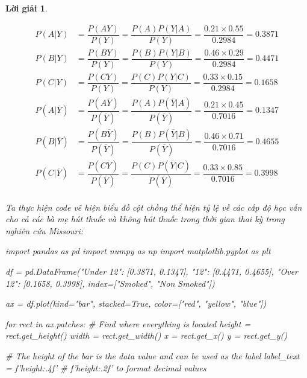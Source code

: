 \documentclass[14pt, a4paper]{article}
\theoremstyle{sltheorem}
\theoremstyle{soltheorem}
\newtheorem*{loigiai}{Lời giải}
\begin{document}
\begin{loigiai}
\begin{enumerate}[wide, labelwidth=!, labelindent=0pt,label=\textbf{\arabic*}.]
        \begin{equation*}
            \begin{aligned}
                P(A \vert Y) &= \dfrac{P(AY)}{P(Y)}=\dfrac{P(A)P(Y\vert A)}{P(Y)}=\dfrac{0.21\times 0.55}{0.2984}=0.3871 \\
                P(B \vert Y) &= \dfrac{P(BY)}{P(Y)}=\dfrac{P(B)P(Y\vert B)}{P(Y)}=\dfrac{0.46\times 0.29}{0.2984}=0.4471 \\
                P(C \vert Y) &= \dfrac{P(CY)}{P(Y)}=\dfrac{P(C)P(Y\vert C)}{P(Y)}=\dfrac{0.33\times 0.15}{0.2984}=0.1658 \\
                P(A \vert \overline{Y}) &= \dfrac{P(A\overline{Y})}{P(\overline{Y})}=\dfrac{P(A)P(\overline{Y}\vert A)}{P(\overline{Y})}=\dfrac{0.21\times 0.45}{0.7016}=0.1347 \\
                P(B \vert \overline{Y}) &= \dfrac{P(B\overline{Y})}{P(\overline{Y})}=\dfrac{P(B)P(\overline{Y}\vert B)}{P(\overline{Y})}=\dfrac{0.46\times 0.71}{0.7016}=0.4655 \\
                P(C \vert \overline{Y}) &= \dfrac{P(C\overline{Y})}{P(\overline{Y})}=\dfrac{P(C)P(\overline{Y}\vert C)}{P(\overline{Y})}=\dfrac{0.33\times 0.85}{0.7016}=0.3998 \\
            \end{aligned}
        \end{equation*}

        Ta thực hiện code vẽ hiện biểu đồ cột chồng thể hiện tỷ lệ về các cấp độ học vấn cho cả các bà mẹ hút thuốc và không hút thuốc trong thời gian thai kỳ trong nghiên cứu Missouri:

        \begin{python}
import pandas as pd
import numpy as np
import matplotlib.pyplot as plt
            
df = pd.DataFrame({"Under 12": [0.3871, 0.1347],
                    "12": [0.4471, 0.4655],
                    "Over 12": [0.1658, 0.3998]},
                    index=["Smoked", "Non Smoked"])
            
ax = df.plot(kind="bar", stacked=True, color=["red", "yellow", "blue"])
            
for rect in ax.patches:
    # Find where everything is located
    height = rect.get_height()
    width = rect.get_width()
    x = rect.get_x()
    y = rect.get_y()
                
    # The height of the bar is the data value and can be used as the label
    label_text = f'{height:.4f}'  # f'{height:.2f}' to format decimal values
                

\end{python}
\end{enumerate}
\end{loigiai}
\end{document}
